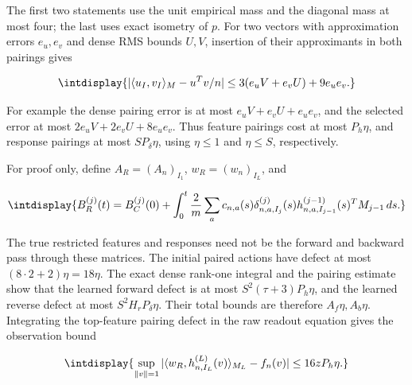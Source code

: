 
The first two statements use the unit empirical mass and the diagonal mass at most four; the last uses exact isometry of \(p\). For two vectors with approximation errors \(e_u,\allowbreak e_v\) and dense RMS bounds \(U,\allowbreak V\), insertion of their approximants in both pairings gives


\begingroup\renewcommand{\theHequation}{intdisplay.578}
\begin{equation}
\intdisplay{
|\langle u_I,v_I\rangle_M-u^Tv/n|
          \le3(e_uV+e_vU)+9e_ue_v.
}
\label{int:eq-0242-harmonic-source-pairing-transfer}
\end{equation}
\endgroup


For example the dense pairing error is at most \(e_uV+e_vU+e_ue_v\), and the selected error at most \(2e_uV+2e_vU+8e_ue_v\). Thus feature pairings cost at most \(P_h\eta\), and response pairings at most \(SP_\delta\eta\), using \(\eta\le1\) and \(\eta\le S\), respectively.



For proof only, define \(A_R=(A_n)_{I_1}\), \(w_R=(w_n)_{I_L}\), and


\begingroup\renewcommand{\theHequation}{intdisplay.579}
\begin{equation}
\intdisplay{
B_R^{(j)}(t)=B_C^{(j)}(0)+
 \int_0^t\frac2m\sum_a c_{n,a}(s)
       \delta_{n,a,I_j}^{(j)}(s)
       h_{n,a,I_{j-1}}^{(j-1)}(s)^TM_{j-1}\,ds.
}
\label{int:eq-0243-harmonic-proof-reference-matrices}
\end{equation}
\endgroup


The true restricted features and responses need not be the forward and backward pass through these matrices. The initial paired actions have defect at most \((8\cdot2+2)\eta=18\eta\). The exact dense rank-one integral and the pairing estimate show that the learned forward defect is at most \(S^2(\tau+3)P_h\eta\), and the learned reverse defect at most \(S^2H_rP_\delta\eta\). Their total bounds are therefore \(A_f\eta,\allowbreak A_b\eta\). Integrating the top-feature pairing defect in the raw readout equation gives the observation bound


\begingroup\renewcommand{\theHequation}{intdisplay.580}
\begin{equation}
\intdisplay{
\sup_{\|v\|=1}|\langle w_R,h_{n,I_L}^{(L)}(v)\rangle_{M_L}-f_n(v)|
                       \le16zP_h\eta.
}
\label{int:eq-0244-harmonic-source-action-and-observation-defects}
\end{equation}
\endgroup

